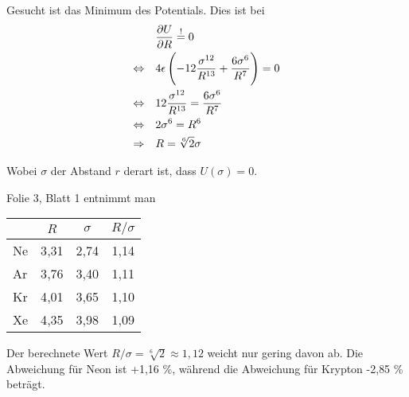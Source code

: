 \documentclass[a4paper,german,12pt,smallheadings]{scrartcl}
\begin{document}
\begin{enumerate}[a)]
    Gesucht ist das Minimum des Potentials. Dies ist bei
    \begin{align}
      &\frac{\partial U}{\partial R} \overset{!}{=} 0 \\
      \Leftrightarrow \quad &
      4 \epsilon \del{-12\frac{\sigma^{12}}{R^{13}} + \frac{6\sigma^6}{R^7}} = 0 \\
      \Leftrightarrow \quad &
      12\frac{\sigma^{12}}{R^{13}} = \frac{6\sigma^6}{R^7} \\
      \Leftrightarrow \quad &
      2 \sigma^6 = R^6 \\
      \Rightarrow \quad & R = \sqrt[6]{2} \sigma
    \end{align}

    Wobei $\sigma$ der Abstand $r$ derart ist, dass $U(\sigma) = 0$.

    Folie 3, Blatt 1 entnimmt man

    \begin{tabular}{l|c|c|c}
      & $R$ & $\sigma$ & $R/\sigma$ \\
      \hline
      Ne & 3{,}31 & 2{,}74 & 1{,}14 \\
      Ar & 3{,}76 & 3{,}40 & 1{,}11 \\
      Kr & 4{,}01 & 3{,}65 & 1{,}10 \\
      Xe & 4{,}35 & 3{,}98 & 1{,}09
    \end{tabular}

    Der berechnete Wert $R/\sigma = \sqrt[6]{2} \approx 1{,}12$ weicht
    nur gering davon ab. Die Abweichung für Neon ist +1{,}16 \%, während die
    Abweichung für Krypton -2{,}85 \% beträgt.
\end{enumerate}
\end{document}
